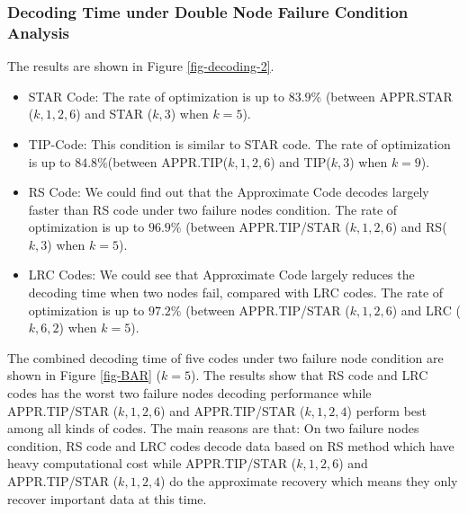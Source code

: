 \documentclass[sigconf]{acmart}
\begin{document}
\subsubsection{Decoding Time under Double Node Failure Condition Analysis}
The results are shown in Figure \ref{fig-decoding-2}.
\begin{itemize}
    \item STAR Code: The rate of optimization is up to $83.9\%$ (between APPR.STAR ($k,1,2,6$) and STAR ($k,3$) when $k = 5$).
    \item TIP-Code: This condition is similar to STAR code. The rate of optimization is up to $84.8\% $(between APPR.TIP($k,1,2,6$) and TIP($k,3$) when $k = 9$).
    \item RS Code: We could find out that the Approximate Code decodes largely faster than RS code under two failure nodes condition. The rate of optimization is up to $96.9\%$ (between APPR.TIP/STAR ($k,1,2,6$) and RS($k,3$) when $k = 5$).
    \item LRC Codes:
    We could see that Approximate Code largely reduces the decoding time when two nodes fail, compared with LRC codes. The rate of optimization is up to $97.2\%$ (between APPR.TIP/STAR ($k,1,2,6$) and LRC ($k, 6, 2$) when $k = 5$).
\end{itemize}

The combined decoding time of five codes under two failure node condition are shown in Figure \ref{fig-BAR} ($k=5$). The results show that RS code and LRC codes has the worst two failure nodes decoding performance while APPR.TIP/STAR ($k,1,2,6$) and APPR.TIP/STAR ($k,1,2,4$) perform best among all kinds of codes. The main reasons are that: On two failure nodes condition, RS code and LRC codes decode data based on RS method which have heavy computational cost while APPR.TIP/STAR ($k,1,2,6$) and APPR.TIP/STAR ($k,1,2,4$) do the approximate recovery which means they only recover important data at this time.
\end{document}
